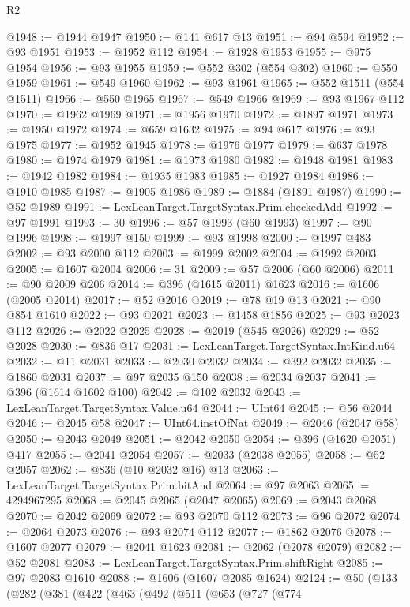 \begin{lexlean}{R2}
\begin{coremodule}
@1948 := @1944 @1947
@1950 := @141 @617 @13
@1951 := @94 @594
@1952 := @93 @1951
@1953 := @1952 @112
@1954 := @1928 @1953
@1955 := @975 @1954
@1956 := @93 @1955
@1959 := @552 @302 (@554 @302)
@1960 := @550 @1959
@1961 := @549 @1960
@1962 := @93 @1961
@1965 := @552 @1511 (@554 @1511)
@1966 := @550 @1965
@1967 := @549 @1966
@1969 := @93 @1967 @112
@1970 := @1962 @1969
@1971 := @1956 @1970
@1972 := @1897 @1971
@1973 := @1950 @1972
@1974 := @659 @1632
@1975 := @94 @617
@1976 := @93 @1975
@1977 := @1952 @1945
@1978 := @1976 @1977
@1979 := @637 @1978
@1980 := @1974 @1979
@1981 := @1973 @1980
@1982 := @1948 @1981
@1983 := @1942 @1982
@1984 := @1935 @1983
@1985 := @1927 @1984
@1986 := @1910 @1985
@1987 := @1905 @1986
@1989 := @1884 (@1891 @1987)
@1990 := @52 @1989
@1991 := LexLeanTarget.TargetSyntax.Prim.checkedAdd
@1992 := @97 @1991
@1993 := 30
@1996 := @57 @1993 (@60 @1993)
@1997 := @90 @1996
@1998 := @1997 @150
@1999 := @93 @1998
@2000 := @1997 @483
@2002 := @93 @2000 @112
@2003 := @1999 @2002
@2004 := @1992 @2003
@2005 := @1607 @2004
@2006 := 31
@2009 := @57 @2006 (@60 @2006)
@2011 := @90 @2009 @206
@2014 := @396 (@1615 @2011) @1623
@2016 := @1606 (@2005 @2014)
@2017 := @52 @2016
@2019 := @78 @19 @13
@2021 := @90 @854 @1610
@2022 := @93 @2021
@2023 := @1458 @1856
@2025 := @93 @2023 @112
@2026 := @2022 @2025
@2028 := @2019 (@545 @2026)
@2029 := @52 @2028
@2030 := @836 @17
@2031 := LexLeanTarget.TargetSyntax.IntKind.u64
@2032 := @11 @2031
@2033 := @2030 @2032
@2034 := @392 @2032
@2035 := @1860 @2031
@2037 := @97 @2035 @150
@2038 := @2034 @2037
@2041 := @396 (@1614 @1602 @100)
@2042 := @102 @2032
@2043 := LexLeanTarget.TargetSyntax.Value.u64
@2044 := UInt64
@2045 := @56 @2044
@2046 := @2045 @58
@2047 := UInt64.instOfNat
@2049 := @2046 (@2047 @58)
@2050 := @2043 @2049
@2051 := @2042 @2050
@2054 := @396 (@1620 @2051) @417
@2055 := @2041 @2054
@2057 := @2033 (@2038 @2055)
@2058 := @52 @2057
@2062 := @836 (@10 @2032 @16) @13
@2063 := LexLeanTarget.TargetSyntax.Prim.bitAnd
@2064 := @97 @2063
@2065 := 4294967295
@2068 := @2045 @2065 (@2047 @2065)
@2069 := @2043 @2068
@2070 := @2042 @2069
@2072 := @93 @2070 @112
@2073 := @96 @2072
@2074 := @2064 @2073
@2076 := @93 @2074 @112
@2077 := @1862 @2076
@2078 := @1607 @2077
@2079 := @2041 @1623
@2081 := @2062 (@2078 @2079)
@2082 := @52 @2081
@2083 := LexLeanTarget.TargetSyntax.Prim.shiftRight
@2085 := @97 @2083 @1610
@2088 := @1606 (@1607 @2085 @1624)
@2124 := @50
    (@133
      (@282
        (@381
          (@422
            (@463
              (@492
                (@511
                  (@653
                    (@727
                      (@774

\end{coremodule}
\end{lexlean}
